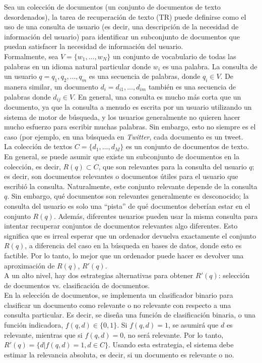 Sea un colección de documentos (un conjunto de documentos de texto desordenados), la tarea de recuperación de texto (TR) puede definirse como el uso de una consulta de usuario (es decir, una descripción de la necesidad de información del usuario) para identificar un subconjunto de documentos que puedan satisfacer la necesidad de información del usuario. \\

Formalmente, sea $V = \{w_1, ..., w_N\}$ un conjunto de vocabulario de todas las palabras en un idioma natural particular donde $w_i$ es una palabra. La consulta de un usuario $q = q_1, q_2, ..., q_m$ es una secuencia de palabras, donde $q_i \in V$. De manera similar, un documento $d_i = d_{i1}, ..., d_{im}$ también es una secuencia de palabras donde $d_{ij} \in V$. En general, una consulta es mucho más corta que un documento, ya que la consulta a menudo es escrita por un usuario utilizando un sistema de motor de búsqueda, y los usuarios generalmente no quieren hacer mucho esfuerzo para escribir muchas palabras. Sin embargo, esto no siempre es el caso (por ejemplo, en una búsqueda en \textit{Twitter}, cada documento es un tweet. \\

La colección de textos $C = \{d_1, ..., d_M\}$ es un conjunto de documentos de texto. En general, se puede asumir que existe un subconjunto de documentos en la colección, es decir, $R(q) \subset C$, que son relevantes para la consulta del usuario $q$; es decir, son documentos relevantes o documentos útiles para el usuario que escribió la consulta. Naturalmente, este conjunto relevante depende de la consulta $q$. Sin embargo, qué documentos son relevantes generalmente es desconocido; la consulta del usuario es solo una ``pista'' de qué documentos deberían estar en el conjunto $R(q)$. Además, diferentes usuarios pueden usar la misma consulta para intentar recuperar conjuntos de documentos relevantes algo diferentes. Esto significa que es irreal esperar que un ordenador devuelva exactamente el conjunto $R(q)$, a diferencia del caso en la búsqueda en bases de datos, donde esto es factible. Por lo tanto, lo mejor que un ordenador puede hacer es devolver una aproximación de $R(q)$, $R'(q)$. \\

A un alto nivel, hay dos estrategias alternativas para obtener $R'(q)$: selección de documentos vs. clasificación de documentos. \\

En la selección de documentos, se implementa un clasificador binario para clasificar un documento como relevante o no relevante con respecto a una consulta particular. Es decir, se diseña una función de clasificación binaria, o una función indicadora, $f(q, d) \in \{0, 1\}$. Si $f(q, d) = 1$, se asumirá que $d$ es relevante, mientras que si $f(q, d) = 0$, no será relevante. Por lo tanto, $R'(q) = \{d | f(q, d) = 1, d \in C\}$. Usando esta estrategia, el sistema debe estimar la relevancia absoluta, es decir, si un documento es relevante o no. \\

